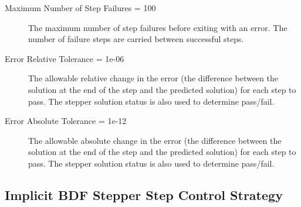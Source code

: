 \begin{list}{}
\begin{description}
      \item[Maximum Number of Step Failures = 100] 
The maximum number of step failures before exiting with an error.  The number of failure steps are carried between successful steps.
      \item[Error Relative Tolerance = 1e-06] 
The allowable relative change in the error (the difference between the solution at the end of the step and the predicted solution) for each step to pass.  The stepper solution status is also used to determine pass/fail.
      \item[Error Absolute Tolerance = 1e-12] 
The allowable absolute change in the error (the difference between the solution at the end of the step and the predicted solution) for each step to pass.  The stepper solution status is also used to determine pass/fail.
\end{description}

\end{list}

\subsection{Implicit BDF Stepper Step Control Strategy}
\label{sec:Implicit BDF Stepper Step Control Strategy}

